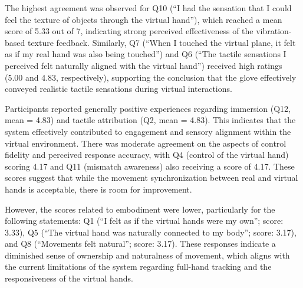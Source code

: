 The highest agreement was observed for Q10 (“I had the sensation that I could feel the texture of objects through the virtual hand”), which reached a mean score of 5.33 out of 7, indicating strong perceived effectiveness of the vibration-based texture feedback. Similarly, Q7 (“When I touched the virtual plane, it felt as if my real hand was also being touched”) and Q6 (“The tactile sensations I perceived felt naturally aligned with the virtual hand”) received high ratings (5.00 and 4.83, respectively), supporting the conclusion that the glove effectively conveyed realistic tactile sensations during virtual interactions.

Participants reported generally positive experiences regarding immersion (Q12, mean = 4.83) and tactile attribution (Q2, mean = 4.83). This indicates that the system effectively contributed to engagement and sensory alignment within the virtual environment. There was moderate agreement on the aspects of control fidelity and perceived response accuracy, with Q4 (control of the virtual hand) scoring 4.17 and Q11 (mismatch awareness) also receiving a score of 4.17. These scores suggest that while the movement synchronization between real and virtual hands is acceptable, there is room for improvement.

However, the scores related to embodiment were lower, particularly for the following statements: Q1 (“I felt as if the virtual hands were my own”; score: 3.33), Q5 (“The virtual hand was naturally connected to my body”; score: 3.17), and Q8 (“Movements felt natural”; score: 3.17). These responses indicate a diminished sense of ownership and naturalness of movement, which aligns with the current limitations of the system regarding full-hand tracking and the responsiveness of the virtual hands.


